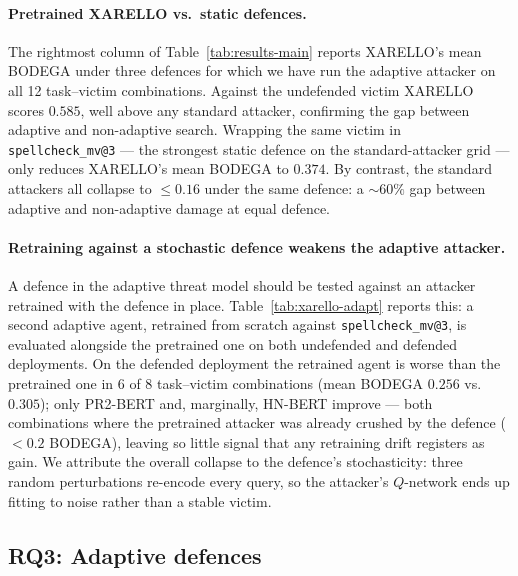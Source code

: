\documentclass[11pt]{article}
\begin{document}
\paragraph{Pretrained XARELLO vs.\ static defences.}
The rightmost column of Table~\ref{tab:results-main} reports XARELLO's mean BODEGA under three defences for which we have run the adaptive attacker on all 12 task--victim combinations. Against the undefended victim XARELLO scores $0.585$, well above any standard attacker, confirming the gap between adaptive and non-adaptive search. Wrapping the same victim in \texttt{spellcheck\_mv@3} --- the strongest static defence on the standard-attacker grid --- only reduces XARELLO's mean BODEGA to $0.374$. By contrast, the standard attackers all collapse to $\leq 0.16$ under the same defence: a $\sim 60\%$ gap between adaptive and non-adaptive damage at equal defence.

\paragraph{Retraining against a stochastic defence weakens the adaptive attacker.}
A defence in the adaptive threat model should be tested against an attacker retrained with the defence in place. Table~\ref{tab:xarello-adapt} reports this: a second adaptive agent, retrained from scratch against \texttt{spellcheck\_mv@3}, is evaluated alongside the pretrained one on both undefended and defended deployments. On the defended deployment the retrained agent is worse than the pretrained one in 6 of 8 task--victim combinations (mean BODEGA $0.256$ vs.\ $0.305$); only PR2-BERT and, marginally, HN-BERT improve --- both combinations where the pretrained attacker was already crushed by the defence ($<\!0.2$ BODEGA), leaving so little signal that any retraining drift registers as gain. We attribute the overall collapse to the defence's stochasticity: three random perturbations re-encode every query, so the attacker's $Q$-network ends up fitting to noise rather than a stable victim. 




\subsection{RQ3: Adaptive defences}
\label{sec:results-rq3}
\end{document}
